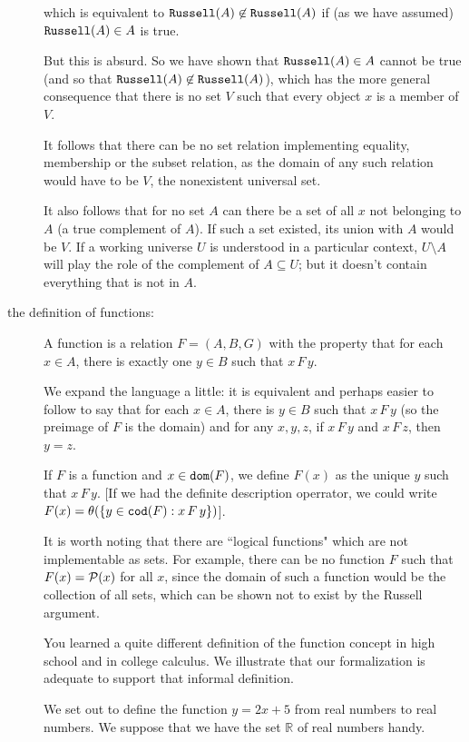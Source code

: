 \documentclass[12pt]{article}
\begin{document}
\begin{description}
which is equivalent to ${\tt Russell}(A) \not\in {\tt Russell}(A)$ if (as we have assumed) ${\tt Russell}(A)\in A$ is true.

But this is absurd.  So we have shown that ${\tt Russell}(A)\in A$  cannot be true (and so that ${\tt Russell}(A) \not\in {\tt Russell}(A)$), which has the more general consequence
that there is no set $V$ such that every object $x$ is a member of $V$.

It follows that there can be no set relation implementing equality, membership or the subset relation, as the domain of any such relation would have to be $V$, the nonexistent universal set.

It also follows that for no set $A$ can there be a set of all $x$ not belonging to $A$ (a true complement of $A$).
If such a set existed, its union with $A$ would be $V$.  If a working universe $U$ is understood in a particular context,
$U \setminus A$ will play the role of the complement of $A \subseteq U$;  but it doesn't contain everything that is not in $A$.



\item[the definition of functions:]

A function is a relation $F = (A,B,G)$ with the property that for each $x \in A$, there is exactly one $y \in B$ such that $x \, F \, y$.

We expand the language a little:  it is equivalent and perhaps easier to follow to say that for each $x \in A$, there is $y \in B$ such that $x \, F\, y$ (so the preimage of $F$ is the domain) and for any $x,y,z$, if $x \, F \, y$ and $x \, F\, z$, then $y=z$.

If $F$ is a function and $x \in {\tt dom}(F)$, we define $F(x)$ as the unique $y$ such that $x \, F \, y$.  [If we had the definite description operrator, we could write $F(x) = \theta(\{y\in {\tt cod}(F):x \, F \, y\})$].

It is worth noting that there are ``logical functions" which are not implementable as sets.  For example,
there can be no function $F$ such that $F(x) = {\cal P}(x)$ for all $x$, since the domain of such a function would be the collection of all sets, which can be shown not to exist by the Russell argument.

You learned a quite different definition of the function concept in high school and in college calculus.  We illustrate that our formalization is adequate to support that informal definition.

We set out to define the function $y=2x+5$ from real numbers to real numbers.  We suppose that we have the set
$\mathbb R$ of real numbers handy.


\end{description}
\end{document}
